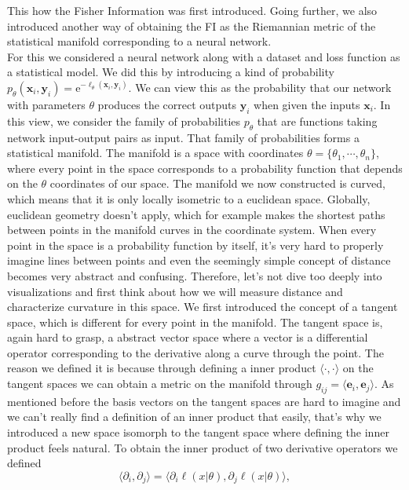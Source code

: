 This how the Fisher Information was first introduced. Going further, we also introduced another way of obtaining the FI as the Riemannian metric of the statistical manifold corresponding to a neural network.\\
For this we considered a neural network along with a dataset and loss function as a statistical model. We did this by introducing a kind of probability $p_\theta(\mathbf{x}_i,\mathbf{y}_i) = \mathrm{e}^{-\ell_\theta(\mathbf{x}_i,\mathbf{y}_i)}$. We can view this as the probability that our network with parameters $\theta$ produces the correct outputs $\mathbf{y}_i$ when given the inputs $\mathbf{x}_i$. In this view, we consider the family of probabilities $p_\theta$ that are functions taking network input-output pairs as input. That family of probabilities forms a statistical manifold. The manifold is a space with coordinates $\theta = \{\theta_1, \cdots, \theta_n\}$, where every point in the space corresponds to a probability function that depends on the $\theta$ coordinates of our space. The manifold we now constructed is curved, which means that it is only locally isometric to a euclidean space. Globally, euclidean geometry doesn't apply, which for example makes the shortest paths between points in the manifold curves in the coordinate system. When every point in the space is a probability function by itself, it's very hard to properly imagine lines between points and even the seemingly simple concept of distance becomes very abstract and confusing. Therefore, let's not dive too deeply into visualizations and first think about how we will measure distance and characterize curvature in this space. We first introduced the concept of a tangent space, which is different for every point in the manifold. The tangent space is, again hard to grasp, a abstract vector space where a vector is a differential operator corresponding to the derivative along a curve through the point. The reason we defined it is because through defining a inner product $\langle \cdot , \cdot \rangle$ on the tangent spaces we can obtain a metric on the manifold through $g_{ij} = \langle \mathbf{e}_i,\mathbf{e}_j\rangle$. As mentioned before the basis vectors on the tangent spaces are hard to imagine and we can't really find a definition of an inner product that easily, that's why we introduced a new space isomorph to the tangent space where defining the inner product feels natural. To obtain the inner product of two derivative operators we defined
\begin{equation}
	\langle \partial_i, \partial_j \rangle = \langle \partial_i \ell(x|\theta), \partial_j \ell(x|\theta) \rangle,
\end{equation}
